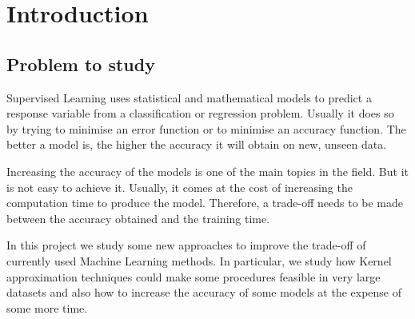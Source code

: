 
\chapter{Introduction} %

\label{Chapter1} %




\section{Problem to study}

\begin{pre-delivery}
  Supervised Learning uses statistical and mathematical models to predict a
  response variable from a classification or regression problem. Usually it does
  so by trying to minimise an error function or to minimise an accuracy function.
  The better a model is, the higher the accuracy it will obtain on new, unseen
  data.

  Increasing the accuracy of the models is one of the main topics in the field.
  But it is not easy to achieve it. Usually, it comes at the cost of increasing the
  computation time to produce the model. Therefore, a trade-off needs to be
  made between the accuracy obtained and the training time.

  In this project we study some new approaches to improve the trade-off of
  currently used Machine Learning methods. In particular, we study how
  Kernel approximation techniques could make some procedures feasible in
  very large datasets and also how to increase the accuracy of some models
  at the expense of some more time.
\end{pre-delivery}


